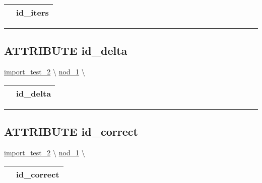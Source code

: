 {\renewcommand{\arraystretch}{1.5}
\begin{tabularx}{\textwidth}{|>{\raggedright\arraybackslash}l|X|}
\hline
\hspace{0pt}\mytexttt{\color{red} } & \textbf{id\_iters} \\
\hline
\end{tabularx}
}

\par


\rule{\linewidth}{0.5pt}
\subsection*{\textsf{\colorbox{headtoc}{\color{white} ATTRIBUTE}
id\_delta}}

\hypertarget{ecldoc:constants.id_delta}{}
\hspace{0pt} \hyperlink{ecldoc:import_test_2}{import_test_2} \textbackslash 
\hspace{0pt} \hyperlink{ecldoc:Constants}{nod_1} \textbackslash 

{\renewcommand{\arraystretch}{1.5}
\begin{tabularx}{\textwidth}{|>{\raggedright\arraybackslash}l|X|}
\hline
\hspace{0pt}\mytexttt{\color{red} } & \textbf{id\_delta} \\
\hline
\end{tabularx}
}

\par


\rule{\linewidth}{0.5pt}
\subsection*{\textsf{\colorbox{headtoc}{\color{white} ATTRIBUTE}
id\_correct}}

\hypertarget{ecldoc:constants.id_correct}{}
\hspace{0pt} \hyperlink{ecldoc:import_test_2}{import_test_2} \textbackslash 
\hspace{0pt} \hyperlink{ecldoc:Constants}{nod_1} \textbackslash 

{\renewcommand{\arraystretch}{1.5}
\begin{tabularx}{\textwidth}{|>{\raggedright\arraybackslash}l|X|}
\hline
\hspace{0pt}\mytexttt{\color{red} } & \textbf{id\_correct} \\
\hline
\end{tabularx}
}

\par


